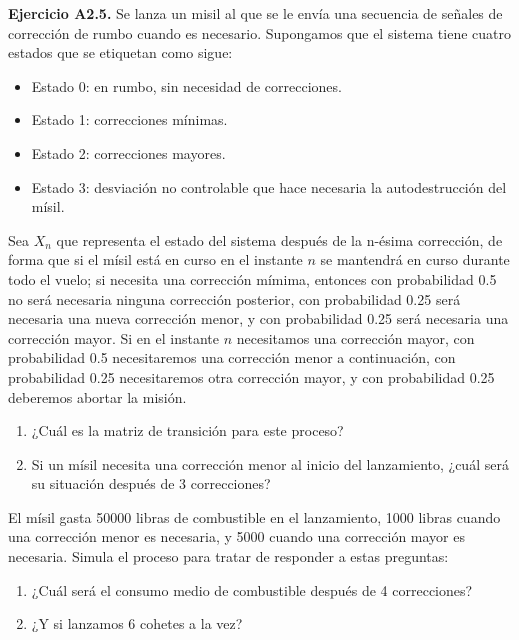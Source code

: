 \documentclass[
]{book}
\providecommand{\tightlist}{%
  \setlength{\itemsep}{0pt}\setlength{\parskip}{0pt}}
\theoremstyle{definition}
\theoremstyle{definition}
\theoremstyle{definition}
\theoremstyle{definition}
\theoremstyle{remark}
\begin{document}
\textbf{Ejercicio A2.5.} Se lanza un misil al que se le envía una secuencia de señales de corrección de rumbo cuando es necesario. Supongamos que el sistema tiene cuatro estados que se etiquetan como sigue:

\begin{itemize}
\tightlist
\item
  Estado 0: en rumbo, sin necesidad de correcciones.
\item
  Estado 1: correcciones mínimas.
\item
  Estado 2: correcciones mayores.
\item
  Estado 3: desviación no controlable que hace necesaria la autodestrucción del mísil.
\end{itemize}

Sea \(X_n\) que representa el estado del sistema después de la n-ésima corrección, de forma que si el mísil está en curso en el instante \(n\) se mantendrá en curso durante todo el vuelo; si necesita una corrección mímima, entonces con probabilidad 0.5 no será necesaria ninguna corrección posterior, con probabilidad 0.25 será necesaria una nueva corrección menor, y con probabilidad 0.25 será necesaria una corrección mayor. Si en el instante \(n\) necesitamos una corrección mayor, con probabilidad 0.5 necesitaremos una corrección menor a continuación, con probabilidad 0.25 necesitaremos otra corrección mayor, y con probabilidad 0.25 deberemos abortar la misión.

\begin{enumerate}
\def\labelenumi{\arabic{enumi}.}
\tightlist
\item
  ¿Cuál es la matriz de transición para este proceso?
\item
  Si un mísil necesita una corrección menor al inicio del lanzamiento, ¿cuál será su situación después de 3 correcciones?
\end{enumerate}

El mísil gasta 50000 libras de combustible en el lanzamiento, 1000 libras cuando una corrección menor es necesaria, y 5000 cuando una corrección mayor es necesaria. Simula el proceso para tratar de responder a estas preguntas:

\begin{enumerate}
\def\labelenumi{\arabic{enumi}.}
\setcounter{enumi}{2}
\tightlist
\item
  ¿Cuál será el consumo medio de combustible después de 4 correcciones?
\item
  ¿Y si lanzamos 6 cohetes a la vez?
\end{enumerate}
\end{document}
